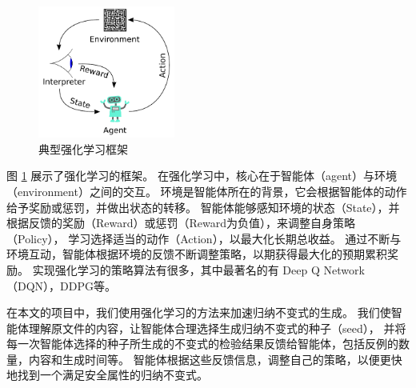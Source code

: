 \begin{figure}[h]
    \centering
    \includegraphics[width=0.4\textwidth]{figures/Reinforcement_learning_diagram.pdf}
    \caption{典型强化学习框架}
    \label{fig:rl}
\end{figure}
图 \ref{fig:rl} 展示了强化学习的框架。
在强化学习中，核心在于智能体（agent）与环境（environment）之间的交互。
环境是智能体所在的背景，它会根据智能体的动作给予奖励或惩罚，并做出状态的转移。
智能体能够感知环境的状态（State），并根据反馈的奖励（Reward）或惩罚（Reward为负值），来调整自身策略（Policy），
学习选择适当的动作（Action），以最大化长期总收益。
通过不断与环境互动，智能体根据环境的反馈不断调整策略，以期获得最大化的预期累积奖励。
实现强化学习的策略算法有很多，其中最著名的有 Deep Q Network（DQN）\cite{dqn}，DDPG\cite{ddpg}等。

在本文的项目中，我们使用强化学习的方法来加速归纳不变式的生成。
我们使智能体理解\TLA 原文件的内容，让智能体合理选择生成归纳不变式的种子（seed），
并将每一次智能体选择的种子所生成的不变式的检验结果反馈给智能体，包括反例的数量，内容和生成时间等。
智能体根据这些反馈信息，调整自己的策略，以便更快地找到一个满足安全属性的归纳不变式。

